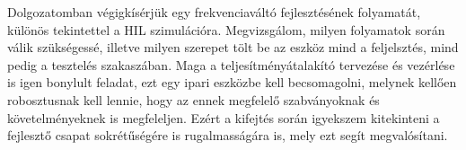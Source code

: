 Dolgozatomban végigkísérjük egy frekvenciaváltó fejlesztésének folyamatát, különös tekintettel a HIL szimulációra. Megvizsgálom, milyen folyamatok során válik szükségessé, illetve milyen szerepet tölt be az eszköz mind a feljelsztés, mind pedig a tesztelés szakaszában. Maga a teljesítményátalakító tervezése és vezérlése is igen bonylult feladat, ezt egy ipari eszközbe kell becsomagolni, melynek kellően robosztusnak kell lennie, hogy az ennek megfelelő szabványoknak és követelményeknek is megfeleljen. Ezért a kifejtés során igyekszem kitekinteni a fejlesztő csapat sokrétűségére is rugalmasságára is, mely ezt segít megvalósítani.